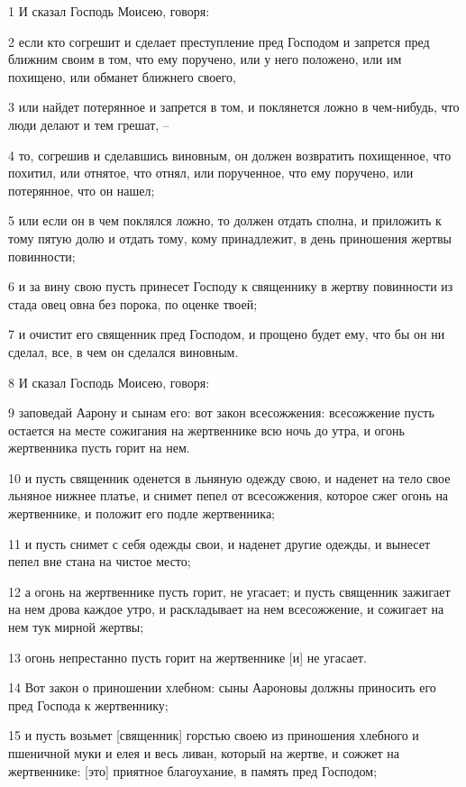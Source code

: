 \par 1 И сказал Господь Моисею, говоря:
\par 2 если кто согрешит и сделает преступление пред Господом и запрется пред ближним своим в том, что ему поручено, или у него положено, или им похищено, или обманет ближнего своего,
\par 3 или найдет потерянное и запрется в том, и поклянется ложно в чем-нибудь, что люди делают и тем грешат, --
\par 4 то, согрешив и сделавшись виновным, он должен возвратить похищенное, что похитил, или отнятое, что отнял, или порученное, что ему поручено, или потерянное, что он нашел;
\par 5 или если он в чем поклялся ложно, то должен отдать сполна, и приложить к тому пятую долю и отдать тому, кому принадлежит, в день приношения жертвы повинности;
\par 6 и за вину свою пусть принесет Господу к священнику в жертву повинности из стада овец овна без порока, по оценке твоей;
\par 7 и очистит его священник пред Господом, и прощено будет ему, что бы он ни сделал, все, в чем он сделался виновным.
\par 8 И сказал Господь Моисею, говоря:
\par 9 заповедай Аарону и сынам его: вот закон всесожжения: всесожжение пусть остается на месте сожигания на жертвеннике всю ночь до утра, и огонь жертвенника пусть горит на нем.
\par 10 и пусть священник оденется в льняную одежду свою, и наденет на тело свое льняное нижнее платье, и снимет пепел от всесожжения, которое сжег огонь на жертвеннике, и положит его подле жертвенника;
\par 11 и пусть снимет с себя одежды свои, и наденет другие одежды, и вынесет пепел вне стана на чистое место;
\par 12 а огонь на жертвеннике пусть горит, не угасает; и пусть священник зажигает на нем дрова каждое утро, и раскладывает на нем всесожжение, и сожигает на нем тук мирной жертвы;
\par 13 огонь непрестанно пусть горит на жертвеннике [и] не угасает.
\par 14 Вот закон о приношении хлебном: сыны Аароновы должны приносить его пред Господа к жертвеннику;
\par 15 и пусть возьмет [священник] горстью своею из приношения хлебного и пшеничной муки и елея и весь ливан, который на жертве, и сожжет на жертвеннике: [это] приятное благоухание, в память пред Господом;
